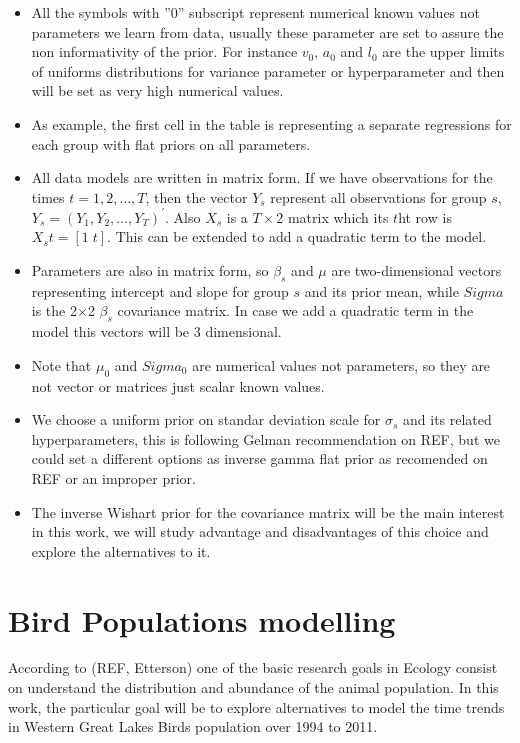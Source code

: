 \documentclass{article}
\begin{document}
\begin{itemize}
	\item All the symbols with ''0'' subscript represent numerical known values not parameters we learn from data, usually these parameter are set to assure the non informativity of the prior. For instance $v_0$, $a_0$ and $l_0$ are the upper limits of uniforms distributions for variance parameter or hyperparameter and then will be set as very high numerical values. 
	\item As example, the first cell in the table is representing a separate regressions for each group with flat priors on all parameters. 
	\item All data models are written in matrix form. If we have observations for the times $t=1, 2, \ldots, T$, then  the vector $Y_s$ represent all observations for group $s$, $Y_s =  (Y_1,Y_2,\dots,Y_T)^{'}$. Also $X_s$ is a $T\times 2$ matrix which its $t$ht row is $X_st = [1\;t]$. This can be extended to add a quadratic term to the model. 
	\item Parameters are also in matrix form, so $\beta_s$ and $\mu$ are two-dimensional vectors representing intercept and slope for group $s$ and its prior mean, while $Sigma$ is the 2$\times$2 $\beta_s$ covariance matrix. In case we add a quadratic term in the model this vectors will be 3 dimensional. 
	\item Note that $\mu_0$ and $Sigma_0$ are numerical values not parameters, so they are not vector or matrices just scalar known values. 
	\item We choose a uniform prior on standar deviation scale for $\sigma_s$ and its related hyperparameters, this is following Gelman recommendation on REF, but we could set a different options as inverse gamma flat prior as recomended on REF or an improper prior. 
	\item The inverse Wishart prior for the covariance matrix will be the main interest in this work, we will study advantage and disadvantages of this choice and explore the alternatives to it. 
\end{itemize}
 


\section{ Bird Populations modelling} 
According to (REF, Etterson) one of the basic research goals in Ecology consist on understand the distribution and abundance of the animal population. In this work, the particular goal will be to explore alternatives to model the time trends in Western Great Lakes Birds population over 1994 to 2011. 
\end{document}

